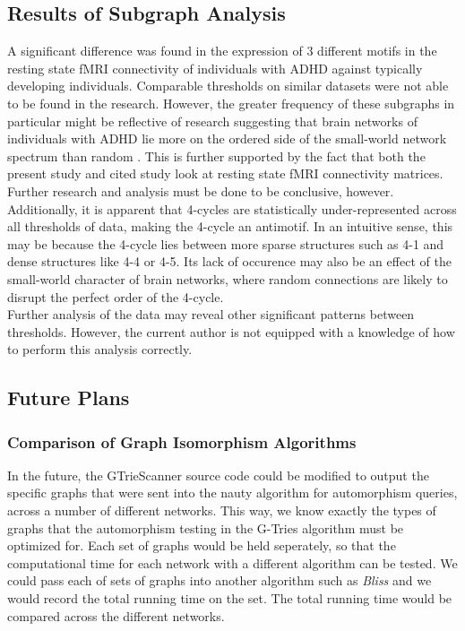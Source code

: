 \subsection{Results of Subgraph Analysis}
A significant difference was found in the expression of 3 different motifs in the resting state fMRI connectivity of individuals with ADHD against typically developing individuals. Comparable thresholds on similar datasets were not able to be found in the research. However, the greater frequency of these subgraphs in particular might be reflective of research suggesting that brain networks of individuals with ADHD lie more on the ordered side of the small-world network spectrum than random \cite{wang09}. This is further supported by the fact that both the present study and cited study look at resting state fMRI connectivity matrices. Further research and analysis must be done to be conclusive, however.\\
Additionally, it is apparent that 4-cycles are statistically under-represented across all thresholds of data, making the 4-cycle an antimotif. In an intuitive sense, this may be because the 4-cycle lies between more sparse structures such as 4-1 and dense structures like 4-4 or 4-5. Its lack of occurence may also be an effect of the small-world character of brain networks, where random connections are likely to disrupt the perfect order of the 4-cycle.\\
Further analysis of the data may reveal other significant patterns between thresholds. However, the current author is not equipped with a knowledge of how to perform this analysis correctly. 
\subsection{Future Plans}
\subsubsection{Comparison of Graph Isomorphism Algorithms}
In the future, the GTrieScanner source code could be modified to output the specific graphs that were sent into the nauty algorithm for automorphism queries, across a number of different networks. This way, we know exactly the types of graphs that the automorphism testing in the G-Tries algorithm must be optimized for. Each set of graphs would be held seperately, so that the computational time for each network with a different algorithm can be tested. We could pass each of sets of graphs into another algorithm such as \emph{Bliss} and we would record the total running time on the set. The total running time would be compared across the different networks. 
